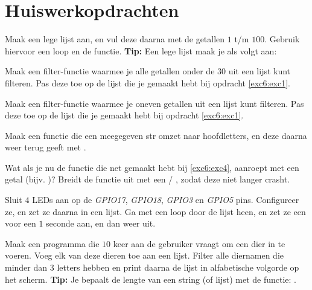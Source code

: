 \newpage

\section{Huiswerkopdrachten}

\begin{exercise}\label{exc6:exc1}
Maak een lege lijst aan, en vul deze daarna met de getallen $1$ t/m $100$.
Gebruik hiervoor een loop en de  functie. \newline
\textbf{Tip:} Een lege lijst maak je als volgt aan: 
\end{exercise}

\begin{exercise}
Maak een filter-functie waarmee je alle getallen onder de $30$ uit een lijst kunt filteren. Pas deze toe op de lijst die je gemaakt hebt bij opdracht \ref{exc6:exc1}.
\end{exercise}

\begin{exercise}
Maak een filter-functie waarmee je oneven getallen uit een lijst kunt filteren. Pas deze toe op de lijst die je gemaakt hebt bij opdracht \ref{exc6:exc1}.
\end{exercise}

\begin{exercise}
\label{exc6:exc4}
Maak een functie  die een meegegeven str omzet naar hoofdletters, en deze daarna weer terug geeft met . 
\end{exercise}

\begin{exercise}
Wat als je nu de functie die net gemaakt hebt bij \ref{exc6:exc4}, aanroept met een getal (bijv. )? \newline
Breidt de functie uit met een  / , zodat deze niet langer crasht. 
\end{exercise}

\begin{exercise}
Sluit $4$ LEDs aan op de \textit{GPIO17}, \textit{GPIO18}, \textit{GPIO3} en \textit{GPIO5} pins. Configureer ze, en zet ze daarna in een lijst. Ga met een loop door de lijst heen, en zet ze een voor een $1$ seconde aan, en dan weer uit.
\end{exercise}

\begin{exercise}
Maak een programma die $10$ keer aan de gebruiker vraagt om een dier in te voeren. Voeg elk van deze dieren toe aan een lijst. Filter alle diernamen die minder dan $3$ letters hebben en print daarna de lijst in alfabetische volgorde op het scherm. \newline
\textbf{Tip:} Je bepaalt de lengte van een string (of lijst) met de functie: .
\end{exercise}
